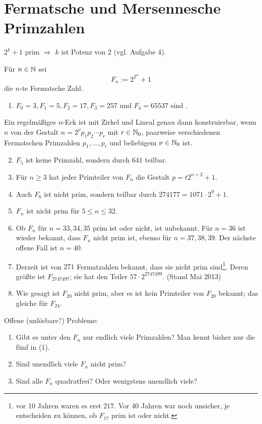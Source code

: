 \section{Fermatsche und Mersennesche Primzahlen}
\label{sec:para7}
	
	$2^k + 1$ prim $\Rightarrow$ $k$ ist Potenz von $2$ (vgl. Aufgabe 4). 
	
Für $n \in \mathbb{N}$ sei
\[ F_n := 2^{2^n} + 1 \]
die $n$-te Fermatsche Zahl.

\begin{enumerate}[(1)]
	\item $F_0 = 3, F_1 = 5, F_2 = 17, F_3 = 257$ und $F_4 = 65537$ sind . 
\end{enumerate}

	Ein regelmäßiges $n$-Eck ist mit Zirkel und Lineal genau dann konstruierbar, wenn $n$ von der Gestalt $n = 2^\nu p_1 p_2 \cdots p_r$ mit $r \in \mathbb{N}_0$, paarweise verschiedenen Fermatschen Primzahlen $p_1,\dots,p_r$ und beliebigem $\nu \in \mathbb{N}_0$ ist.
	
\begin{enumerate}[(1)] \setcounter{enumi}{1}
	\item $F_5$ ist keine Primzahl, sondern durch $641$ teilbar.
	\item Für $n \geq 3$ hat jeder Primteiler von $F_n$ die Gestalt $p = t 2^{n+2} + 1$.
	\item Auch $F_6$ ist nicht prim, sondern teilbar durch $274177 = 1071 \cdot 2^9 + 1$.
	\item $F_n$ ist nicht prim für $5 \leq n \leq 32$.
	\item Ob $F_n$ für $n = 33, 34, 35$ prim ist oder nicht, ist unbekannt. Für $n = 36$ ist wieder bekannt, dass $F_n$ nicht prim ist, ebenso für $n = 37, 38, 39$. Der nächste offene Fall ist $n = 40$.
	\item Derzeit ist von $271$ Fermatzahlen bekannt, dass sie nicht prim sind\footnote{vor 10 Jahren waren es erst $217$. Vor 40 Jahren war noch unsicher, je entscheiden zu können, ob $F_{17}$ prim ist oder nicht.}. Deren größte ist $F_{2747497}$; sie hat den Teiler $57 \cdot 2^{2747499}$. (Stand Mai 2013)
	\item Wie gesagt ist $F_{20}$ nicht prim, aber es ist kein Primteiler von $F_{20}$ bekannt; das gleiche für $F_{24}$.
\end{enumerate}

Offene (unlösbare?) Probleme:
\begin{enumerate}[1)]
	\item Gibt es unter den $F_n$ nur endlich viele Primzahlen? Man kennt bisher nur die fünf in (1).
	\item Sind unendlich viele $F_n$ nicht prim?
	\item Sind alle $F_n$ quadratfrei? Oder wenigstens unendlich viele?
\end{enumerate}

